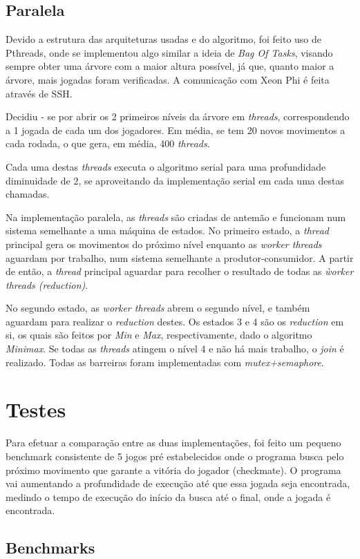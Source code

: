 \documentclass[12pt,a4paper,final]{article}
\begin{document}
\subsection{Paralela}

Devido a estrutura das arquiteturas usadas e do algoritmo, foi feito uso de Pthreads, onde se implementou algo similar a ideia de \textit{Bag Of Tasks}, visando sempre obter uma árvore com a maior altura possível, já que, quanto maior a árvore, mais jogadas foram verificadas. A comunicação com Xeon Phi é feita através de SSH.

Decidiu - se por abrir os 2 primeiros níveis da árvore em \textit{threads}, correspondendo a 1 jogada de cada um dos jogadores. Em média, se tem 20 novos movimentos a cada rodada, o que gera, em média, 400 \textit{threads}.

Cada uma destas \textit{threads} executa o algoritmo serial para uma profundidade diminuidade de 2, se aproveitando da implementação serial em cada uma destas chamadas.

Na implementação paralela, as \textit{threads} são criadas de antemão e funcionam num sistema semelhante a uma máquina de estados. No primeiro estado, a \textit{thread} principal gera os movimentos do próximo nível enquanto as \textit{worker threads} aguardam por trabalho, num sistema semelhante a produtor-consumidor. A partir de então, a \textit{thread} principal aguardar para recolher o resultado de todas as \textit{ẁorker threads (reduction)}.

No segundo estado, as \textit{worker threads} abrem o segundo nível, e também aguardam para realizar o \textit{reduction} destes. Os estados 3 e 4 são os \textit{reduction} em si, os quais são feitos por \textit{Min} e \textit{Max}, respectivamente, dado o algoritmo \textit{Minimax}. Se todas as \textit{threads} atingem o nível 4 e não há mais trabalho, o \textit{join} é realizado. Todas as barreiras foram implementadas com \textit{mutex+semaphore}.

\section{Testes}

Para efetuar a comparação entre as duas implementações, foi feito um pequeno benchmark consistente de 5 jogos pré estabelecidos onde o programa busca pelo próximo movimento que garante a vitória do jogador (checkmate). O programa vai aumentando a profundidade de execução até que essa jogada seja encontrada, medindo o tempo de execução do início da busca até o final, onde a jogada é encontrada.

\subsection{Benchmarks}


%  
%
%
\end{document}
